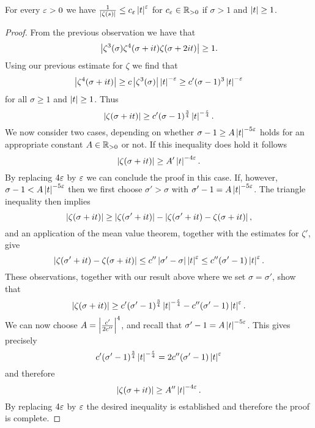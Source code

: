 \begin{proposition}
	For every $\varepsilon > 0$ we have $\frac{1}{\left|\zeta(s)\right|} \leq c_\varepsilon \left|t\right|^\varepsilon$ for $c_\varepsilon \in \mathbb{R}_{> 0}$ if $\sigma > 1$ and $\left|t\right| \geq 1$.
\end{proposition}
\begin{proof}
	From the previous observation we have that
\begin{equation*}
	\left|\zeta^3(\sigma) \zeta^4(\sigma + it) \zeta(\sigma + 2it)\right| \geq 1.
\end{equation*}
	Using our previous estimate for $\zeta$ we find that
\begin{equation*}
	\left|\zeta^4(\sigma + it)\right| \geq c \left|\zeta^3(\sigma)\right| \left|t\right|^{-\varepsilon} \geq c' (\sigma - 1)^3 \left|t\right|^{-\varepsilon}
\end{equation*}
	for all $\sigma \geq 1$ and $\left|t\right| \geq 1$. Thus
\begin{equation*}
	\left|\zeta(\sigma + it)\right| \geq c' (\sigma - 1)^{\frac{3}{4}} \left|t\right|^{-\frac{\varepsilon}{4}}.
\end{equation*}
	We now consider two cases, depending on whether $\sigma - 1 \geq A\left|t\right|^{-5 \varepsilon}$ holds for an appropriate constant $A \in \mathbb{R}_{> 0}$ or not. If this inequality does hold it follows
\begin{equation*}
	\left|\zeta(\sigma + it)\right| \geq A' \left|t\right|^{-4 \varepsilon}.
\end{equation*}
	By replacing $4 \varepsilon$ by $\varepsilon$ we can conclude the proof in this case. If, however, $\sigma - 1 < A\left|t\right|^{-5 \varepsilon}$ then we first choose $\sigma' > \sigma$ with $\sigma' - 1 = A \left|t\right|^{-5 \varepsilon}$. The triangle inequality then implies
\begin{equation*}
	\left|\zeta(\sigma + it)\right| \geq \left|\zeta(\sigma' + it)\right| - \left|\zeta(\sigma' + it) - \zeta(\sigma + it)\right|,
\end{equation*}
	and an application of the mean value theorem, together with the estimates for $\zeta'$, give
\begin{equation*}
	\left|\zeta(\sigma' + it) - \zeta(\sigma + it)\right| \leq c'' \left|\sigma' - \sigma\right| \left|t\right|^{\varepsilon} \leq c''(\sigma' - 1)\left|t\right|^{\varepsilon}.
\end{equation*}
	These observations, together with our result above where we set $\sigma = \sigma'$, show that
\begin{equation*}
	\left|\zeta(\sigma + it)\right| \geq c'(\sigma' - 1)^{\frac{3}{4}}\left|t\right|^{-\frac{\varepsilon}{4}} - c''(\sigma' - 1)\left|t\right|^{\varepsilon}.
\end{equation*}
	We can now choose $A = \left|\frac{c'}{2 c''}\right|^4$, and recall that $\sigma' - 1 = A \left|t\right|^{-5 \varepsilon}$. This gives precisely
\begin{equation*}
	c'(\sigma' - 1)^{\frac{3}{4}} \left|t\right|^{-\frac{\varepsilon}{4}} = 2 c''(\sigma' - 1) \left|t\right|^{\varepsilon}
\end{equation*}
	and therefore
\begin{equation*}
	\left|\zeta(\sigma + it)\right| \geq A''\left|t\right|^{-4 \varepsilon}.
\end{equation*}
	By replacing $4 \varepsilon$ by $\varepsilon$ the desired inequality is established and therefore the proof is complete.
\end{proof}


